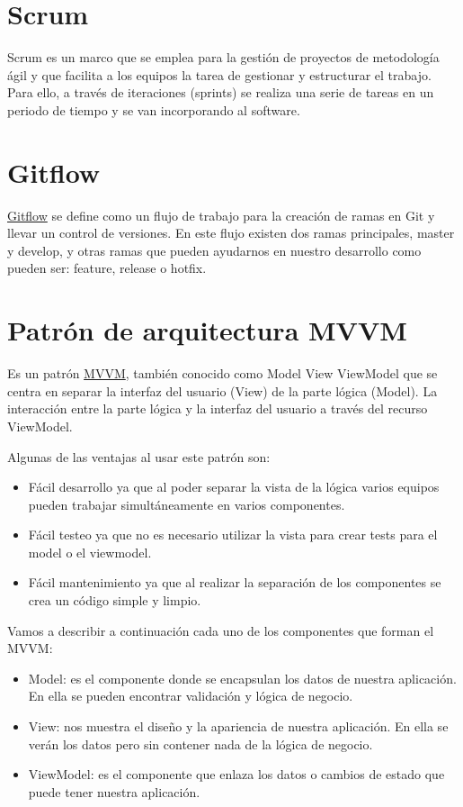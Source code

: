 \section{Scrum}
Scrum es un marco que se emplea para la gestión de proyectos de metodología ágil y que facilita a los equipos la tarea de gestionar y estructurar el trabajo. Para ello, a través de iteraciones (sprints) se realiza una serie de tareas en un periodo de tiempo y se van incorporando al software.
\section{Gitflow}
\href{https://www.atlassian.com/es/git/tutorials/comparing-workflows/gitflow-workflow}{Gitflow} se define como un flujo de trabajo para la creación de ramas en Git y llevar un control de versiones. En este flujo existen dos ramas principales, master y develop, y otras ramas que pueden ayudarnos en nuestro desarrollo como pueden ser: feature, release o  hotfix.
\section{Patrón de arquitectura MVVM}
Es un patrón \href{https://learn.microsoft.com/es-es/dotnet/architecture/maui/mvvm}{MVVM}, también conocido como Model View ViewModel que se centra en separar la interfaz del usuario (View) de la parte lógica (Model). La interacción entre la parte lógica y la interfaz del usuario a través del recurso ViewModel.

Algunas de las ventajas al usar este patrón son:
\begin{itemize}
\item Fácil desarrollo ya que al poder separar la vista de la lógica varios equipos pueden trabajar simultáneamente en varios componentes.
\item Fácil testeo ya que no es necesario utilizar la vista para crear tests para el model o el viewmodel.
\item Fácil mantenimiento ya que al realizar la separación de los componentes se crea un código simple y limpio.
\end{itemize}

Vamos a describir a continuación cada uno de los componentes que forman el MVVM:
\begin{itemize}
	\item Model: es el componente donde se encapsulan los datos de nuestra aplicación. En ella se pueden encontrar validación y lógica de negocio.
	\item View: nos muestra el diseño y la apariencia de nuestra aplicación. En ella se verán los datos pero sin contener nada de la lógica de negocio.
	\item ViewModel: es el componente que enlaza los datos o cambios de estado que puede tener nuestra aplicación.
\end{itemize}

